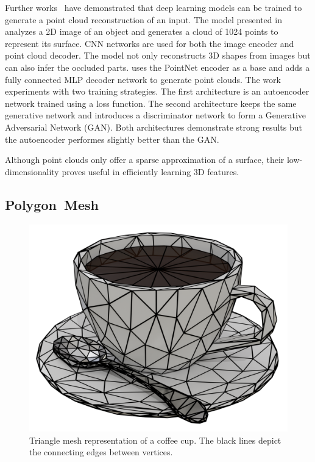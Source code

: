 Further works~\cite{Fan2017, Achlioptas2018} have demonstrated that deep learning models can be trained to generate a point cloud reconstruction of an input. The model presented in~\cite{Fan2017} analyzes a 2D image of an object and generates a cloud of 1024 points to represent its surface. CNN networks are used for both the image encoder and point cloud decoder. The model not only reconstructs 3D shapes from images but can also infer the occluded parts. \cite{Achlioptas2018} uses the PointNet encoder as a base and adds a fully connected MLP decoder network to generate point clouds. The work experiments with two training strategies. The first architecture is an autoencoder network trained using a loss function. The second architecture keeps the same generative network and introduces a discriminator network to form a Generative Adversarial Network (GAN). Both architectures demonstrate strong results but the autoencoder performes slightly better than the GAN.

Although point clouds only offer a sparse approximation of a surface, their low-dimensionality proves useful in efficiently learning 3D features.


\subsection{Polygon~Mesh}
\label{subsec:polygon_mesh}

\begin{figure}[ht]
	\centering
	\includegraphics[scale=0.2]{Images/Mesh Cup}
	\caption{Triangle mesh representation of a coffee cup. The black lines depict the connecting edges between vertices.}
	\label{fig:mesh_cup}
\end{figure}

